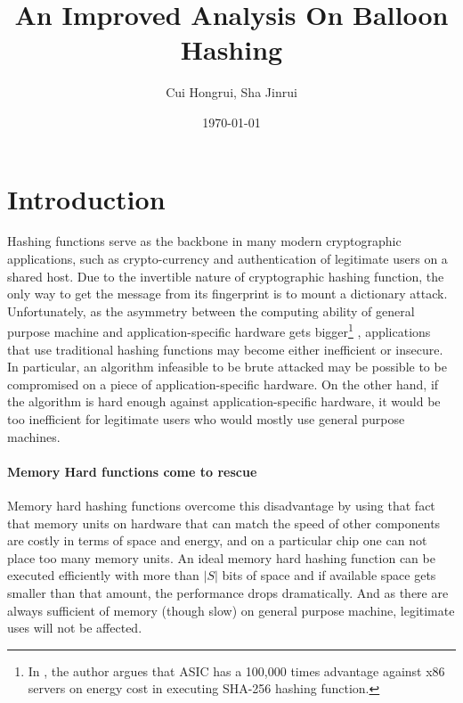 \documentclass[a4paper]{article}
\author{Cui Hongrui, Sha Jinrui}
\date{\today}
\title{An Improved Analysis On Balloon Hashing}
\begin{document}
\maketitle
\section{Introduction}

Hashing functions serve as the backbone in many modern cryptographic applications, such as crypto-currency and
authentication of legitimate users on a shared host. Due to the invertible nature of cryptographic hashing function,
the only way to get the message %
from its fingerprint is to mount a dictionary attack. Unfortunately, as the asymmetry between the computing ability
of general purpose machine and application-specific hardware gets bigger\footnote{In \cite{corrigan2016balloon}, the author
argues that ASIC has a 100,000 times advantage against x86 servers on energy cost in executing SHA-256 hashing function.}
, applications that use traditional hashing
functions may become either inefficient or insecure. In particular, an algorithm infeasible to be brute attacked may be
possible to be compromised on a piece of application-specific hardware. On the other hand, if the algorithm is hard
enough against application-specific hardware, it would be too inefficient for legitimate users who would mostly use
general purpose machines.

\paragraph{Memory Hard functions come to rescue}
Memory hard hashing functions overcome this disadvantage by using that fact that memory units on hardware that can
match the speed of other components are costly in terms of space and energy, and on a particular chip one can not
place too many memory units. An ideal memory hard hashing function can be executed efficiently with more than $|S|$
bits of space and if available space gets smaller than that amount, the performance drops dramatically. And as
there are always sufficient of memory (though slow) on general purpose machine, legitimate uses will not be affected.
\end{document}
